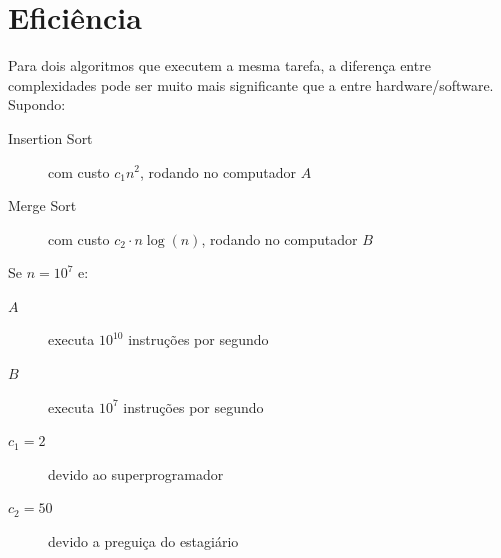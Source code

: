 \section{Eficiência}
\begin{frame}[label=main]
	Para dois algoritmos que executem a mesma tarefa, a diferença entre 
	complexidades pode ser muito mais significante que a entre hardware/software.
	\\\vfill\pause
	Supondo:
	\begin{description}
		\item[Insertion Sort] com custo $c_1n^2$, rodando no computador $A$
		\item[Merge Sort] com custo $c_2\cdot{n}\log(n)$, rodando no computador $B$
	\end{description}
	\vfill\pause
	Se $n = 10^7$ e:
	\begin{description}
		\item[$A$] executa $10^{10}$ instruções por segundo
		\item[$B$] executa $10^{7}$ instruções por segundo
		\item[$c_1 = 2$] devido ao superprogramador
		\item[$c_2 = 50$] devido a preguiça do estagiário
	\end{description}
\end{frame}
